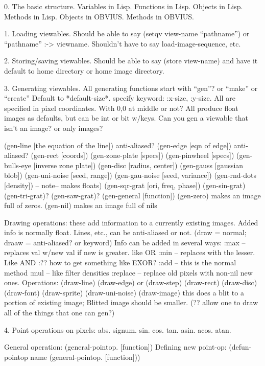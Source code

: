 0. The basic structure.
	Variables in Lisp.  Functions in Lisp.  Objects in Lisp.  Methods
in Lisp.
	Objects in OBVIUS.  Methods in OBVIUS.  

1. Loading viewables.  	
	Should be able to say (setqv view-name ``pathname'') 	
	or ``pathname'' :-> viewname.  Shouldn't have to say
	load-image-sequence, etc.

2. Storing/saving viewables.
	Should be able to say (store view-name) and have it default to
	home directory or home image directory.

3. Generating viewables.
	All generating functions start with ``gen''? or ``make'' or ``create''
	Default to *default-size*. specify keyword: :x-size, :y-size.
	All are specified in pixel coordinates.  With 0,0 at middle or not?
	All produce float images as defaults, but can be int or bit w/keys.
	Can you gen a viewable that isn't an image? or only images?

	(gen-line [the equation of the line]) anti-aliased?
	(gen-edge [eqn of edge]) anti-aliased?
	(gen-rect [coords])
	(gen-zone-plate [specs])
	(gen-pinwheel [specs])
	(gen-bulls-eye [inverse zone plate])
	(gen-disc [radius, center])
	(gen-gauss [gaussian blob])
	(gen-uni-noise [seed, range])
	(gen-gau-noise [seed, variance])
	(gen-rnd-dots [density]) -- note-- makes floats)
	(gen-sqr-grat [ori, freq, phase])
	(gen-sin-grat)
	(gen-tri-grat)?
	(gen-saw-grat)?
	(gen-general [function])
	(gen-zero) makes an image full of zeros.
	(gen-nil) makes an image full of nils

Drawing operations: these add information to a currently existing images.
	Added info is normally float.  Lines, etc., can be anti-aliased
	or not. (draw = normal; draaw = anti-aliased?  or keyword)
	Info can be added in several ways:
		:max -- replaces val w/new val if new is greater. like OR
		:min -- replaces with the lesser. Like AND
		:?? how to get something like EXOR?
		:add -- this is the normal method
		:mul -- like filter densities
		:replace -- replace old pixels with non-nil new ones.
	Operations:
	(draw-line)
	(draw-edge) or (draw-step)
	(draw-rect)
	(draw-disc)
	(draw-font)
	(draw-sprite)
	(draw-uni-noise)
	(draw-image)  this does a blit to a portion of existing image;
		Blitted image should be smaller.
	(?? allow one to draw all of the things that one can gen?)

4. Point operations on pixels:
	abs.
	signum.
	sin. cos. tan. asin. acos. atan.
	
	General operation: (general-pointop. [function])
	Defining new point-op: 
		(defun-pointop name (general-pointop. [function]))	

